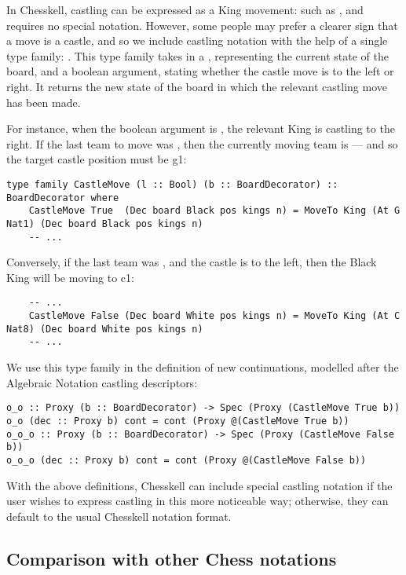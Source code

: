 In Chesskell, castling can be expressed as a King movement: such as , and requires no special notation. However, some people may prefer a clearer sign that a move is a castle, and so we include castling notation with the help of a single type family: . This type family takes in a , representing the current state of the board, and a boolean argument, stating whether the castle move is to the left or right. It returns the new state of the board in which the relevant castling move has been made.

For instance, when the boolean argument is , the relevant King is castling to the right. If the last team to move was , then the currently moving team is  --- and so the target castle position must be g1:

\begin{lstlisting}
type family CastleMove (l :: Bool) (b :: BoardDecorator) :: BoardDecorator where
    CastleMove True  (Dec board Black pos kings n) = MoveTo King (At G Nat1) (Dec board Black pos kings n)
    -- ...
\end{lstlisting}

Conversely, if the last team was , and the castle is to the left, then the Black King will be moving to c1:

\begin{lstlisting}
    -- ...
    CastleMove False (Dec board White pos kings n) = MoveTo King (At C Nat8) (Dec board White pos kings n)
    -- ...
\end{lstlisting}

We use this type family in the definition of new continuations, modelled after the Algebraic Notation castling descriptors:

\begin{lstlisting}
o_o :: Proxy (b :: BoardDecorator) -> Spec (Proxy (CastleMove True b))
o_o (dec :: Proxy b) cont = cont (Proxy @(CastleMove True b))
o_o_o :: Proxy (b :: BoardDecorator) -> Spec (Proxy (CastleMove False b))
o_o_o (dec :: Proxy b) cont = cont (Proxy @(CastleMove False b))
\end{lstlisting}

With the above definitions, Chesskell can include special castling notation if the user wishes to express castling in this more noticeable way; otherwise, they can default to the usual Chesskell notation format.

\subsection{Comparison with other Chess notations}


